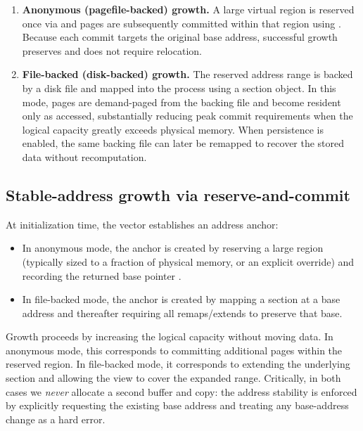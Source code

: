 \begin{enumerate}
  \item \textbf{Anonymous (pagefile-backed) growth.} A large virtual region is
  reserved once via  and pages are
  subsequently committed within that region using
  . Because each commit
  targets the original base address, successful growth preserves
   and does not require relocation.

  \item \textbf{File-backed (disk-backed) growth.} The reserved address range is
  backed by a disk file and mapped into the process using a section object. In
  this mode, pages are demand-paged from the backing file and become resident
  only as accessed, substantially reducing peak commit requirements when the
  logical capacity greatly exceeds physical memory. When persistence is enabled,
  the same backing file can later be remapped to recover the stored data without
  recomputation.
\end{enumerate}

\subsection{Stable-address growth via reserve-and-commit}
\label{sec:reserve_commit}

At initialization time, the vector establishes an address anchor:
\begin{itemize}
  \item In anonymous mode, the anchor is created by reserving a large region
  (typically sized to a fraction of physical memory, or an explicit override)
  and recording the returned base pointer .
  \item In file-backed mode, the anchor is created by mapping a section at a
  base address and thereafter requiring all remaps/extends to preserve that base.
\end{itemize}

Growth proceeds by increasing the logical capacity 
without moving data. In anonymous mode, this corresponds to committing
additional pages within the reserved region. In file-backed mode, it corresponds
to extending the underlying section and allowing the view to cover the expanded
range. Critically, in both cases we \emph{never} allocate a second buffer and
copy: the address stability is enforced by explicitly requesting the existing
base address and treating any base-address change as a hard error.

